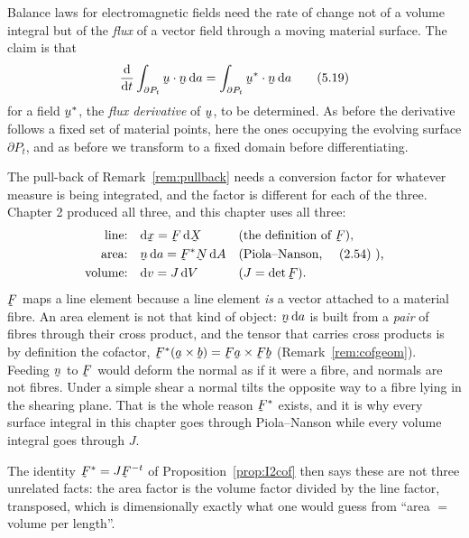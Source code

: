 Balance laws for electromagnetic fields need the rate of change not of a
volume integral but of the \emph{flux} of a vector field through a moving
material surface. The claim is that
\begin{equation}
   \frac{\dl}{\dl t}\int_{\partial P_{t}}\ip\bu\bn\,\dl a
   =\int_{\partial P_{t}}\ip{\bu^{*}}\bn\,\dl a
   \tag{5.19}\label{eq:5.19}
\end{equation}
for a field $\bu^{*}$, the \emph{flux derivative} of $\bu$, to be
determined. As before the derivative follows a fixed set of material
points, here the ones occupying the evolving surface $\partial P_{t}$, and
as before we transform to a fixed domain before differentiating.

\begin{remark}\label{rem:whycof}
The pull-back of Remark~\ref{rem:pullback} needs a conversion factor for
whatever measure is being integrated, and the factor is different for each
of the three. Chapter 2 produced all three, and this chapter uses all
three:
\[
\begin{aligned}
   \text{line:}\quad &\dl\bx=\bF\,\dl\bX
     &&\text{(the definition of }\bF\text{),}\\
   \text{area:}\quad &\bn\,\dl a=\bF^{*}\bN\,\dl A
     &&\text{(Piola--Nanson, \eqr{2.54}),}\\
   \text{volume:}\quad &\dl v=J\,\dl V
     &&\text{(}J=\det\bF\text{).}
\end{aligned}
\]
$\bF$ maps a line element because a line element \emph{is} a vector
attached to a material fibre. An area element is not that kind of object:
$\bn\,\dl a$ is built from a \emph{pair} of fibres through their cross
product, and the tensor that carries cross products is by definition the
cofactor, $\bF^{*}(\ba\times\bb)=\bF\ba\times\bF\bb$
(Remark~\ref{rem:cofgeom}). Feeding $\bn$ to $\bF$ would deform the normal
as if it were a fibre, and normals are not fibres. Under a simple shear a normal tilts the
opposite way to a fibre lying in the shearing plane. That is the whole reason $\bF^{*}$ exists, and it is
why every surface integral in this chapter goes through Piola--Nanson
while every volume integral goes through $J$.

The identity $\bF^{*}=J\bF^{-t}$ of Proposition~\ref{prop:I2cof} then says
these are not three unrelated facts: the area factor is the volume factor
divided by the line factor, transposed, which is dimensionally exactly
what one would guess from ``area $=$ volume per length''.
\end{remark}

